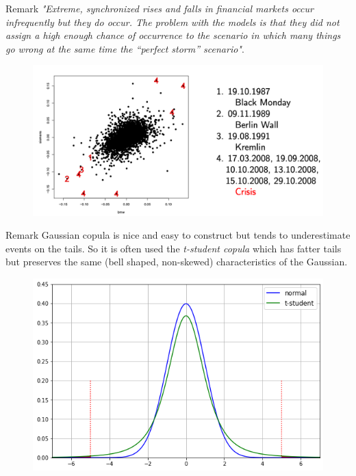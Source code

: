 \documentclass{beamer}
\begin{document}
\begin{frame}{Remark}
  \emph{"Extreme, synchronized rises and falls in financial markets occur
infrequently but they do occur. The problem with the models is that
they did not assign a high enough chance of occurrence to the scenario
in which many things go wrong at the same time the “perfect storm” scenario"}.
  \begin{figure}[h]
    \begin{center}
      \includegraphics[width=0.7\linewidth]{crisis}
    \end{center}
  \end{figure}
\end{frame}

\begin{frame}{Remark}
Gaussian copula is nice and easy to construct but tends to underestimate events on the tails. So it is often used the \emph{t-student copula} which has fatter tails but preserves the same (bell shaped, non-skewed) characteristics of the Gaussian.

\begin{figure}[h]
  \begin{center}
    \includegraphics[width=0.5\linewidth]{gauss_vs_t}
  \end{center}
\end{figure}
\end{frame}
\end{document}
